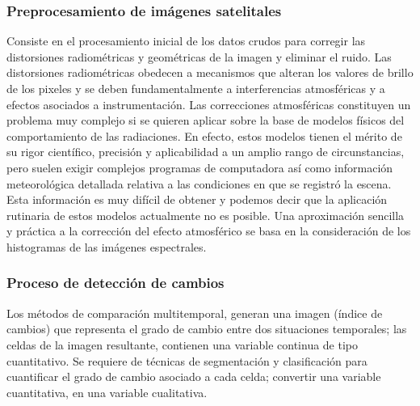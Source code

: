 \documentclass[xcolor=table]{beamer}
\begin{document}
\begin{frame}\frametitle{Preprocesamiento de im\'agenes satelitales}
Consiste en el procesamiento inicial de los datos crudos para corregir las distorsiones radiom\'etricas y geom\'etricas de la imagen y eliminar el ruido.  Las distorsiones radiom\'etricas obedecen a mecanismos que alteran los valores de brillo de  los pixeles y se deben fundamentalmente a interferencias atmosf\'ericas y a efectos asociados  a instrumentaci\'on. Las correcciones atmosf\'ericas constituyen un problema muy complejo si se quieren aplicar  sobre la base de modelos f\'isicos del comportamiento de las radiaciones. En efecto, estos modelos tienen el m\'erito de su rigor cient\'ifico, precisi\'on y aplicabilidad a un amplio rango de circunstancias, pero suelen exigir complejos programas de computadora así como información meteorol\'ogica detallada relativa a las condiciones en que se registr\'o la escena. Esta informaci\'on es muy difícil de obtener y podemos decir que la aplicaci\'on rutinaria de estos modelos actualmente no es posible.  Una aproximaci\'on sencilla y pr\'actica a la correcci\'on del efecto atmosf\'erico se basa en la  consideraci\'on de los histogramas de las im\'agenes espectrales.
\end{frame}
\begin{frame}\frametitle{Proceso de detecci\'on de cambios}
Los m\'etodos de comparaci\'on multitemporal, generan una imagen
(\'indice de cambios) que representa el grado de cambio entre dos situaciones temporales;
las celdas de la imagen resultante, contienen una variable continua de tipo cuantitativo. Se
requiere de t\'ecnicas de segmentaci\'on y clasificaci\'on para cuantificar el
grado de cambio asociado a cada celda; convertir una variable cuantitativa, en una variable
cualitativa.
\end{frame}
\end{document}
